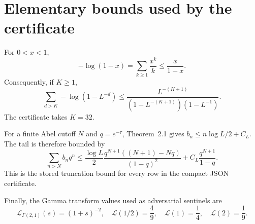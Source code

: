 \appendix
\section{Elementary bounds used by the certificate}

For $0<x<1$,
\[
-\log(1-x)=\sum_{k\ge1}\frac{x^k}{k}\le\frac{x}{1-x}.
\]
Consequently, if $K\ge1$,
\[
\sum_{d>K}-\log(1-L^{-d})
\le
\frac{L^{-(K+1)}}{(1-L^{-(K+1)})(1-L^{-1})}.
\]
The certificate takes $K=32$.

For a finite Abel cutoff $N$ and $q=e^{-\tau}$, Theorem~2.1 gives
$b_n\le n\log L/2+C_L$.  The tail is therefore bounded by
\[
\sum_{n>N}b_nq^n
\le\frac{\log L}{2}
\frac{q^{N+1}((N+1)-Nq)}{(1-q)^2}
+C_L\frac{q^{N+1}}{1-q}.
\]
This is the stored truncation bound for every row in the compact JSON
certificate.

Finally, the Gamma transform values used as adversarial sentinels are
\[
\mathcal L_{\Gamma(2,1)}(s)=(1+s)^{-2},
\quad
\mathcal L(1/2)=\frac49,
\quad
\mathcal L(1)=\frac14,
\quad
\mathcal L(2)=\frac19.
\]
